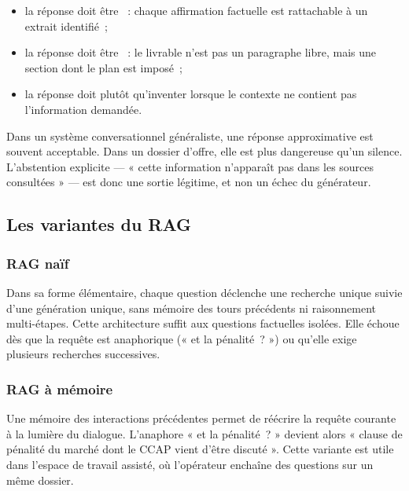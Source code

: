 \begin{itemize}
  \item la réponse doit être ~: chaque affirmation factuelle
        est rattachable à un extrait identifié~;
  \item la réponse doit être ~: le livrable n'est pas un
        paragraphe libre, mais une section dont le plan est imposé~;
  \item la réponse doit  plutôt qu'inventer lorsque le
        contexte ne contient pas l'information demandée.
\end{itemize}

\begin{btpnote}
Dans un système conversationnel généraliste, une réponse approximative est
souvent acceptable. Dans un dossier d'offre, elle est plus dangereuse qu'un
silence. L'abstention explicite --- « cette information n'apparaît pas dans
les sources consultées » --- est donc une sortie légitime, et non un échec
du générateur.
\end{btpnote}

\subsection{Les variantes du RAG}

\subsubsection{RAG naïf}

Dans sa forme élémentaire, chaque question déclenche une recherche unique
suivie d'une génération unique, sans mémoire des tours précédents ni
raisonnement multi-étapes. Cette architecture suffit aux questions
factuelles isolées. Elle échoue dès que la requête est anaphorique
(« et la pénalité~? ») ou qu'elle exige plusieurs recherches successives.

\subsubsection{RAG à mémoire}

Une mémoire des interactions précédentes permet de réécrire la requête
courante à la lumière du dialogue. L'anaphore « et la pénalité~? » devient
alors « clause de pénalité du marché dont le CCAP vient d'être discuté ».
Cette variante est utile dans l'espace de travail assisté, où l'opérateur
enchaîne des questions sur un même dossier.


